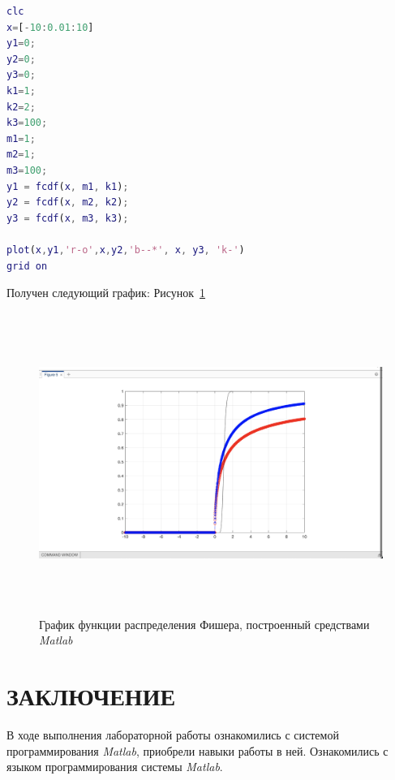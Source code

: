 \documentclass[a4paper,hidelinks,14pt]{extarticle}
\begin{document}
\begin{minipage}{\linewidth}
    \begin{lstlisting}[language=matlab,caption=Код программы \textit{Matlab}, label={lst:listing3}]
clc
x=[-10:0.01:10]
y1=0;
y2=0;
y3=0;
k1=1;
k2=2;
k3=100;
m1=1;
m2=1;
m3=100;
y1 = fcdf(x, m1, k1);
y2 = fcdf(x, m2, k2);
y3 = fcdf(x, m3, k3);

plot(x,y1,'r-o',x,y2,'b--*', x, y3, 'k-')
grid on
\end{lstlisting}
\end{minipage}

Получен следующий график: Рисунок~\ref{fig:fig5}
\begin{figure}[!htbp]
    \centering
    \includegraphics[width=150mm,height=98mm]{fig/raspr_plotn.png}
    \caption{График функции распределения Фишера, построенный средствами \textit{Matlab}}
    \label{fig:fig5}
\end{figure}


\section*{ЗАКЛЮЧЕНИЕ}

В ходе выполнения лабораторной работы ознакомились с системой  программирования \textit{Matlab}, приобрели навыки работы в ней. Ознакомились с языком программирования системы \textit{Matlab}.


\newpage


\end{document}
